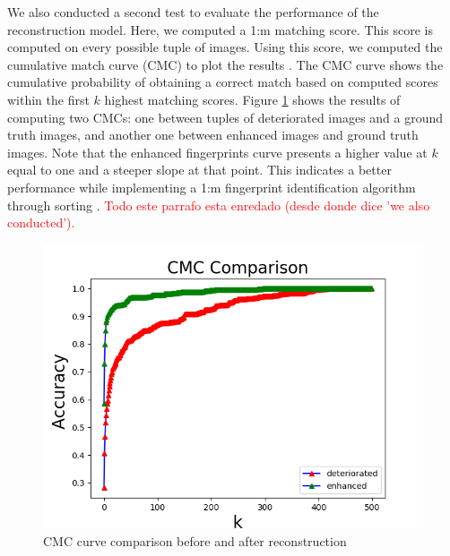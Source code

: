 \documentclass[a4paper,fleqn]{cas-dc}
\begin{document}
We also conducted a second test to evaluate the performance of the reconstruction model. Here, we computed a 1:m matching score. This score is computed on every possible tuple of images. Using this score, we computed the cumulative match curve (CMC) to plot the results \cite{RROCCMC}. The CMC curve shows the cumulative probability of obtaining a correct match based on computed scores within the first $k$ highest matching scores. Figure \ref{fig10} shows the results of computing two CMCs: one between tuples of deteriorated images and a ground truth images, and another one between enhanced images and ground truth images. Note that the enhanced fingerprints curve presents a higher value at $k$ equal to one and a steeper slope at that point. This indicates a better performance while implementing a 1:m fingerprint identification algorithm through sorting \cite{RROCCMC}. \textcolor{red}{Todo este parrafo esta enredado (desde donde dice 'we also conducted').}
\begin{figure}[htbp]
\centerline{\includegraphics[scale=0.5]{figs/cmc_comparison.png}}
\caption{CMC curve comparison before and after reconstruction}
\label{fig10}
\end{figure}
\end{document}
